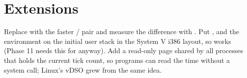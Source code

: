 \documentclass[11pt,a4paper]{article}
\begin{document}
\section{Extensions}

Replace  with the faster / pair and measure the difference with
. Put ,  and the environment on the initial user stack in the System V i386 layout,
so  works (Phase 11 needs this for  anyway). Add a read-only page shared by
all processes that holds the current tick count, so programs can read the time without a system call; Linux's vDSO
grew from the same idea.

\booklegend
\end{document}
